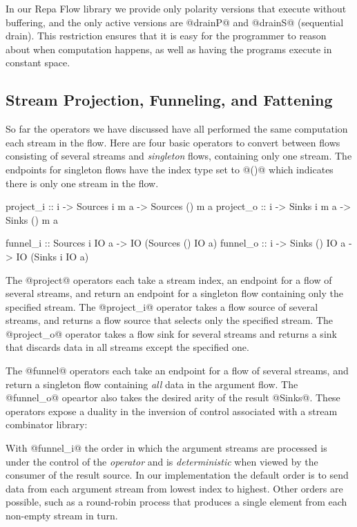 In our Repa Flow library we provide only polarity versions that execute without buffering, and the only active versions are @drainP@ and @drainS@ (sequential drain). This restriction ensures that it is easy for the programmer to reason about when computation happens, as well as having the programs execute in constant space.


\subsection{Stream Projection, Funneling, and Fattening}
So far the operators we have discussed have all performed the same computation each stream in the flow. Here are four basic operators to convert between flows consisting of several streams and \emph{singleton} flows, containing only one stream. The endpoints for singleton flows have the index type set to @()@ which indicates there is only one stream in the flow.
\begin{code}
project_i :: i -> Sources i m a -> Sources () m a
project_o :: i -> Sinks   i m a -> Sinks   () m a

funnel_i :: Sources i IO a ->  IO (Sources () IO a)
funnel_o :: i -> Sinks () IO a -> IO (Sinks i IO a)
\end{code}

The @project@ operators each take a stream index, an endpoint for a flow of several streams, and return an endpoint for a singleton flow containing only the specified stream. The @project_i@ operator takes a flow source of several streams, and returns a flow source that selects only the specified stream. The @project_o@ operator takes a flow sink for several streams and returns a sink that discards data in all streams except the specified one.

The @funnel@ operators each take an endpoint for a flow of several streams, and return a singleton flow containing \emph{all} data in the argument flow. The @funnel_o@ opeartor also takes the desired arity of the result @Sinks@. These operators expose a duality in the inversion of control associated with a stream combinator library:

With @funnel_i@ the order in which the argument streams are processed is under the control of the \emph{operator} and is \emph{deterministic} when viewed by the consumer of the result source. In our implementation the default order is to send data from each argument stream from lowest index to highest. Other orders are possible, such as a round-robin process that produces a single element from each non-empty stream in turn. 

